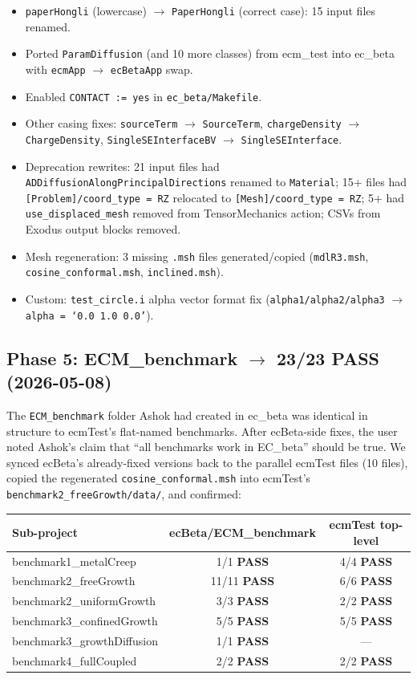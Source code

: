 \documentclass[11pt,letterpaper]{article}
\newenvironment{tightitemize}{\begin{itemize}\setlength\itemsep{0pt}\setlength\parsep{0pt}}{\end{itemize}}
\newcommand{\code}[1]{\texttt{\small #1}}
\newcommand{\PASS}{\textcolor{passgreen}{\textbf{PASS}}}
\begin{document}
\begin{tightitemize}
  \item \code{paperHongli} (lowercase) $\to$ \code{PaperHongli} (correct case): 15 input files renamed.
  \item Ported \code{ParamDiffusion} (and 10 more classes) from ecm\_test into ec\_beta with \code{ecmApp} $\to$ \code{ecBetaApp} swap.
  \item Enabled \code{CONTACT := yes} in \code{ec\_beta/Makefile}.
  \item Other casing fixes: \code{sourceTerm} $\to$ \code{SourceTerm}, \code{chargeDensity} $\to$ \code{ChargeDensity}, \code{SingleSEInterfaceBV} $\to$ \code{SingleSEInterface}.
  \item Deprecation rewrites: 21 input files had \code{ADDiffusionAlongPrincipalDirections} renamed to \code{*Material}; 15+ files had \code{[Problem]/coord\_type = RZ} relocated to \code{[Mesh]/coord\_type = RZ}; 5+ had \code{use\_displaced\_mesh} removed from TensorMechanics action; CSVs from Exodus output blocks removed.
  \item Mesh regeneration: 3 missing \code{.msh} files generated/copied (\code{mdlR3.msh}, \code{cosine\_conformal.msh}, \code{inclined.msh}).
  \item Custom: \code{test\_circle.i} alpha vector format fix (\code{alpha1/alpha2/alpha3} $\to$ \code{alpha = `0.0 1.0 0.0'}).
\end{tightitemize}

\subsection{Phase 5: ECM\_benchmark $\to$ 23/23 PASS (2026-05-08)}

The \code{ECM\_benchmark} folder Ashok had created in ec\_beta was identical
in structure to ecmTest's flat-named benchmarks. After ecBeta-side fixes,
the user noted Ashok's claim that ``all benchmarks work in EC\_beta'' should
be true. We synced ecBeta's already-fixed versions back to the parallel
ecmTest files (10 files), copied the regenerated \code{cosine\_conformal.msh}
into ecmTest's \code{benchmark2\_freeGrowth/data/}, and confirmed:

\begin{center}
\begin{tabular}{l c c}
\toprule
Sub-project & ecBeta/ECM\_benchmark & ecmTest top-level \\
\midrule
benchmark1\_metalCreep & 1/1 \PASS & 4/4 \PASS \\
benchmark2\_freeGrowth & 11/11 \PASS & 6/6 \PASS \\
benchmark2\_uniformGrowth & 3/3 \PASS & 2/2 \PASS \\
benchmark3\_confinedGrowth & 5/5 \PASS & 5/5 \PASS \\
benchmark3\_growthDiffusion & 1/1 \PASS & --- \\
benchmark4\_fullCoupled & 2/2 \PASS & 2/2 \PASS \\
\bottomrule
\end{tabular}
\end{center}
\end{document}
